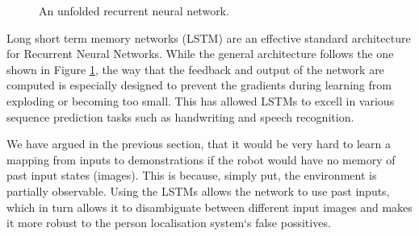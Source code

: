 \documentclass[a4paper,11pt]{report}
\begin{document}
\begin{figure}[h!]
\caption{An unfolded recurrent neural network.}
\label{fig:RNN}
\end{figure}
  
Long short term memory networks (LSTM) \cite{hochreiter1997long} are an effective standard architecture for Recurrent Neural Networks. While the general architecture follows the one shown in Figure \ref{fig:RNN}, the way that the feedback and output of the network are computed is especially designed to prevent the gradients during learning from exploding or becoming too small. This has allowed LSTMs to excell in various sequence prediction tasks such as handwriting and speech recognition. 

We have argued in the previous section, that it would be very hard to learn a mapping from inputs to demonstrations if the robot would have no memory of past input states (images). This is because, simply put, the environment is partially observable. Using the LSTMs allows the network to use past inputs, which in turn allows it to disambiguate between different input images and makes it more robust to the person localisation system`s false possitives. 
\end{document}
